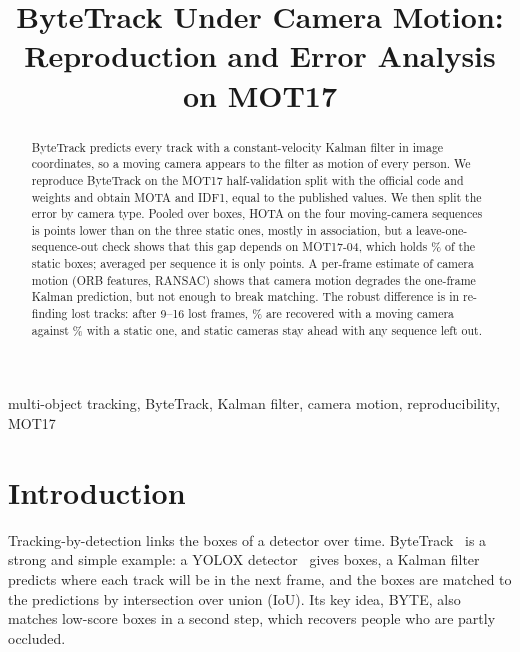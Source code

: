 \documentclass[conference]{IEEEtran}
\begin{document}
\title{ByteTrack Under Camera Motion:\\ Reproduction and Error Analysis on MOT17}

\author{
}

\maketitle

\begin{abstract}
ByteTrack predicts every track with a constant-velocity Kalman filter in image coordinates, so a moving camera
appears to the filter as motion of every person. We reproduce ByteTrack on the MOT17 half-validation split with the
official code and weights and obtain \vEoneMOTA{} MOTA and \vEoneIDF{} IDF1, equal to the published values. We then
split the error by camera type. Pooled over boxes, HOTA on the four moving-camera sequences is \vGapHOTA{} points
lower than on the three static ones, mostly in association, but a leave-one-sequence-out check shows that this gap
depends on MOT17-04, which holds \vFourShareStaticGT\% of the static boxes; averaged per sequence it is only
\vSeqMeanGap{} points. A per-frame estimate of camera motion (ORB features, RANSAC) shows that camera motion degrades the one-frame
Kalman prediction, but not enough to break matching. The robust difference is in re-finding lost tracks: after 9--16
lost frames, \vLostMoving\% are recovered with a moving camera against \vLostStatic\% with a static one, and static
cameras stay ahead with any sequence left out.
\end{abstract}

\begin{IEEEkeywords}
multi-object tracking, ByteTrack, Kalman filter, camera motion, reproducibility, MOT17
\end{IEEEkeywords}

\section{Introduction}
Tracking-by-detection links the boxes of a detector over time. ByteTrack~\cite{zhang2022bytetrack} is a strong and
simple example: a YOLOX detector~\cite{ge2021yolox} gives boxes, a Kalman filter~\cite{kalman1960} predicts where each
track will be in the next frame, and the boxes are matched to the predictions by intersection over union (IoU). Its
key idea, BYTE, also matches low-score boxes in a second step, which recovers people who are partly occluded.
\end{document}
